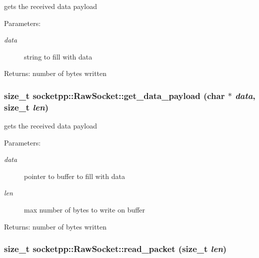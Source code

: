 gets the received data payload 

\begin{Desc}
\item[Parameters:]
\begin{description}
\item[{\em data}]string to fill with data \end{description}
\end{Desc}
\begin{Desc}
\item[Returns:]number of bytes written \end{Desc}
\hypertarget{classsocketpp_1_1RawSocket_bd9631abfa5165ad4ed9e2a31640d1f0}{
\subsubsection[{get\_\-data\_\-payload}]{\setlength{\rightskip}{0pt plus 5cm}size\_\-t socketpp::RawSocket::get\_\-data\_\-payload (char $\ast$ {\em data}, \/  size\_\-t {\em len})}}
\label{classsocketpp_1_1RawSocket_bd9631abfa5165ad4ed9e2a31640d1f0}


gets the received data payload 

\begin{Desc}
\item[Parameters:]
\begin{description}
\item[{\em data}]pointer to buffer to fill with data \item[{\em len}]max number of bytes to write on buffer \end{description}
\end{Desc}
\begin{Desc}
\item[Returns:]number of bytes written \end{Desc}
\hypertarget{classsocketpp_1_1RawSocket_ea48bec4596e2afc89adba2ccb13f6c8}{
\subsubsection[{read\_\-packet}]{\setlength{\rightskip}{0pt plus 5cm}size\_\-t socketpp::RawSocket::read\_\-packet (size\_\-t {\em len})}}
\label{classsocketpp_1_1RawSocket_ea48bec4596e2afc89adba2ccb13f6c8}


